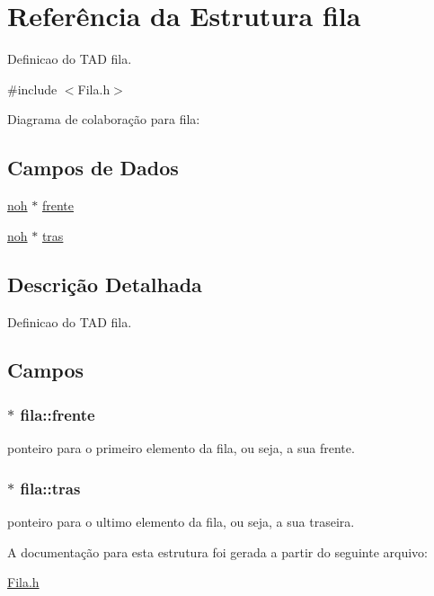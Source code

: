 \hypertarget{structfila}{\section{Referência da Estrutura fila}
\label{structfila}
}


Definicao do T\+A\+D fila.  




{\ttfamily \#include $<$Fila.\+h$>$}



Diagrama de colaboração para fila\+:
\subsection*{Campos de Dados}
\begin{DoxyCompactItemize}
\item 
\hyperlink{Noh_8h_a0d7ef1758ed4704552e1e2020f126654}{noh} $\ast$ \hyperlink{structfila_ae9819e7b0f6f2986ee67fbce3219d87b}{frente}
\item 
\hyperlink{Noh_8h_a0d7ef1758ed4704552e1e2020f126654}{noh} $\ast$ \hyperlink{structfila_ae9b150c1e9ed92975a976ad1c6060ba5}{tras}
\end{DoxyCompactItemize}


\subsection{Descrição Detalhada}
Definicao do T\+A\+D fila. 

\subsection{Campos}
\hypertarget{structfila_ae9819e7b0f6f2986ee67fbce3219d87b}{
\subsubsection[{frente}]{$\ast$ fila\+::frente}}\label{structfila_ae9819e7b0f6f2986ee67fbce3219d87b}
ponteiro para o primeiro elemento da fila, ou seja, a sua frente. \hypertarget{structfila_ae9b150c1e9ed92975a976ad1c6060ba5}{
\subsubsection[{tras}]{$\ast$ fila\+::tras}}\label{structfila_ae9b150c1e9ed92975a976ad1c6060ba5}
ponteiro para o ultimo elemento da fila, ou seja, a sua traseira. 

A documentação para esta estrutura foi gerada a partir do seguinte arquivo\+:\begin{DoxyCompactItemize}
\item 
\hyperlink{Fila_8h}{Fila.\+h}\end{DoxyCompactItemize}
